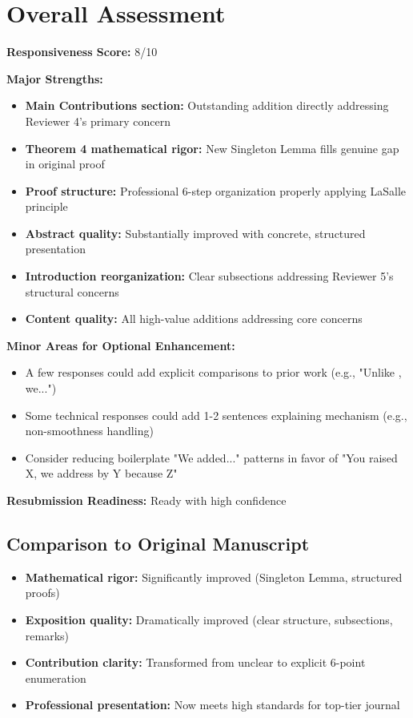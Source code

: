 \documentclass[11pt]{article}
\begin{document}
\section{Overall Assessment}

\textbf{Responsiveness Score:} 8/10

\textbf{Major Strengths:}
\begin{itemize}
\item \textbf{Main Contributions section:} Outstanding addition directly addressing Reviewer 4's primary concern
\item \textbf{Theorem 4 mathematical rigor:} New Singleton Lemma fills genuine gap in original proof
\item \textbf{Proof structure:} Professional 6-step organization properly applying LaSalle principle
\item \textbf{Abstract quality:} Substantially improved with concrete, structured presentation
\item \textbf{Introduction reorganization:} Clear subsections addressing Reviewer 5's structural concerns
\item \textbf{Content quality:} All high-value additions addressing core concerns
\end{itemize}

\textbf{Minor Areas for Optional Enhancement:}
\begin{itemize}
\item A few responses could add explicit comparisons to prior work (e.g., "Unlike \cite{X}, we...")
\item Some technical responses could add 1-2 sentences explaining mechanism (e.g., non-smoothness handling)
\item Consider reducing boilerplate "We added..." patterns in favor of "You raised X, we address by Y because Z"
\end{itemize}

\textbf{Resubmission Readiness:} \textcolor{success}{Ready with high confidence}

\subsection{Comparison to Original Manuscript}

\begin{itemize}
\item \textbf{Mathematical rigor:} Significantly improved (Singleton Lemma, structured proofs)
\item \textbf{Exposition quality:} Dramatically improved (clear structure, subsections, remarks)
\item \textbf{Contribution clarity:} Transformed from unclear to explicit 6-point enumeration
\item \textbf{Professional presentation:} Now meets high standards for top-tier journal
\end{itemize}
\end{document}
